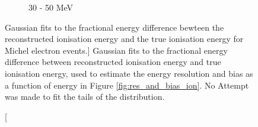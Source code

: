 \begin{figure}
\begin{subfigure}[b]{0.49\textwidth}
		\caption {30 - 50 MeV}
		\label{fig:ion_fit_30}
	\end{subfigure}

	\caption
	[Gaussian fits to the fractional energy difference bewteen the reconstructed
	ionisation energy and the true ionisation energy for Michel electron events.]
	{Gaussian fits to the fractional energy difference between reconstructed 
	ionisation energy and true ionisation energy, used to estimate the energy 
	resolution and bias as a function of energy in Figure 
	\ref{fig:res_and_bias_ion}. No Attempt was made to fit the tails of the 
	distribution.}
	\label{fig:ionisation_fits}

\end{figure}
